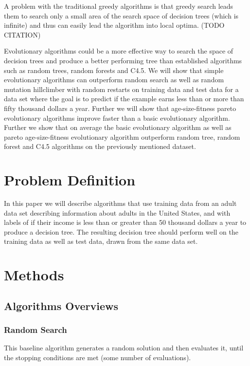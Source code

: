 \documentclass{acm_proc_article-sp}
\begin{document}
A problem with the traditional greedy algorithms is that greedy search leads them to search only a small area of the search space of decision trees (which is infinite) and thus can easily lead the algorithm into local optima. (TODO CITATION)

Evolutionary algorithms could be a more effective way to search the space of decision trees and produce a better performing tree than established algorithms such as random trees, random forests and C4.5. We will show that simple evolutionary algorithms can outperform random search as well as random mutation hillclimber with random restarts on training data and test data for a data set where the goal is to predict if the example earns less than or more than fifty thousand dollars a year. Further we will show that age-size-fitness pareto evolutionary algorithms improve faster than a basic evolutionary algorithm. Further we show that on average the basic evolutionary algorithm as well as pareto age-size-fitness evolutionary algorithm outperform random tree, random forest and C4.5 algorithms on the previously mentioned dataset.

\section{Problem Definition}

In this paper we will describe algorithms that use training data from an adult data set describing information about adults in the United States, and with labels of if their income is less than or greater than 50 thousand dollars a year to produce a decision tree. The resulting decision tree should perform well on the training data as well as test data, drawn from the same data set.

\section{Methods}

\subsection{Algorithms Overviews}

\subsubsection{Random Search}

This baseline algorithm generates a random solution and then evaluates it, until the stopping conditions are met (some number of evaluations).
\end{document}
